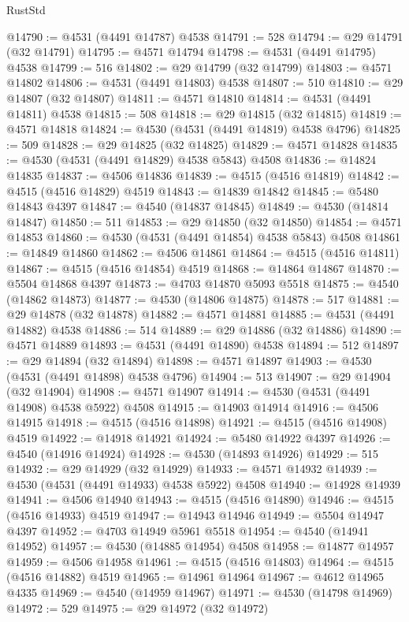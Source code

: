 \begin{lexlean}{RustStd}
\begin{coremodule}
@14790 := @4531 (@4491 @14787) @4538
@14791 := 528
@14794 := @29 @14791 (@32 @14791)
@14795 := @4571 @14794
@14798 := @4531 (@4491 @14795) @4538
@14799 := 516
@14802 := @29 @14799 (@32 @14799)
@14803 := @4571 @14802
@14806 := @4531 (@4491 @14803) @4538
@14807 := 510
@14810 := @29 @14807 (@32 @14807)
@14811 := @4571 @14810
@14814 := @4531 (@4491 @14811) @4538
@14815 := 508
@14818 := @29 @14815 (@32 @14815)
@14819 := @4571 @14818
@14824 := @4530 (@4531 (@4491 @14819) @4538 @4796)
@14825 := 509
@14828 := @29 @14825 (@32 @14825)
@14829 := @4571 @14828
@14835 := @4530 (@4531 (@4491 @14829) @4538 @5843) @4508
@14836 := @14824 @14835
@14837 := @4506 @14836
@14839 := @4515 (@4516 @14819)
@14842 := @4515 (@4516 @14829) @4519
@14843 := @14839 @14842
@14845 := @5480 @14843 @4397
@14847 := @4540 (@14837 @14845)
@14849 := @4530 (@14814 @14847)
@14850 := 511
@14853 := @29 @14850 (@32 @14850)
@14854 := @4571 @14853
@14860 := @4530 (@4531 (@4491 @14854) @4538 @5843) @4508
@14861 := @14849 @14860
@14862 := @4506 @14861
@14864 := @4515 (@4516 @14811)
@14867 := @4515 (@4516 @14854) @4519
@14868 := @14864 @14867
@14870 := @5504 @14868 @4397
@14873 := @4703 @14870 @5093 @5518
@14875 := @4540 (@14862 @14873)
@14877 := @4530 (@14806 @14875)
@14878 := 517
@14881 := @29 @14878 (@32 @14878)
@14882 := @4571 @14881
@14885 := @4531 (@4491 @14882) @4538
@14886 := 514
@14889 := @29 @14886 (@32 @14886)
@14890 := @4571 @14889
@14893 := @4531 (@4491 @14890) @4538
@14894 := 512
@14897 := @29 @14894 (@32 @14894)
@14898 := @4571 @14897
@14903 := @4530 (@4531 (@4491 @14898) @4538 @4796)
@14904 := 513
@14907 := @29 @14904 (@32 @14904)
@14908 := @4571 @14907
@14914 := @4530 (@4531 (@4491 @14908) @4538 @5922) @4508
@14915 := @14903 @14914
@14916 := @4506 @14915
@14918 := @4515 (@4516 @14898)
@14921 := @4515 (@4516 @14908) @4519
@14922 := @14918 @14921
@14924 := @5480 @14922 @4397
@14926 := @4540 (@14916 @14924)
@14928 := @4530 (@14893 @14926)
@14929 := 515
@14932 := @29 @14929 (@32 @14929)
@14933 := @4571 @14932
@14939 := @4530 (@4531 (@4491 @14933) @4538 @5922) @4508
@14940 := @14928 @14939
@14941 := @4506 @14940
@14943 := @4515 (@4516 @14890)
@14946 := @4515 (@4516 @14933) @4519
@14947 := @14943 @14946
@14949 := @5504 @14947 @4397
@14952 := @4703 @14949 @5961 @5518
@14954 := @4540 (@14941 @14952)
@14957 := @4530 (@14885 @14954) @4508
@14958 := @14877 @14957
@14959 := @4506 @14958
@14961 := @4515 (@4516 @14803)
@14964 := @4515 (@4516 @14882) @4519
@14965 := @14961 @14964
@14967 := @4612 @14965 @4335
@14969 := @4540 (@14959 @14967)
@14971 := @4530 (@14798 @14969)
@14972 := 529
@14975 := @29 @14972 (@32 @14972)

\end{coremodule}
\end{lexlean}
